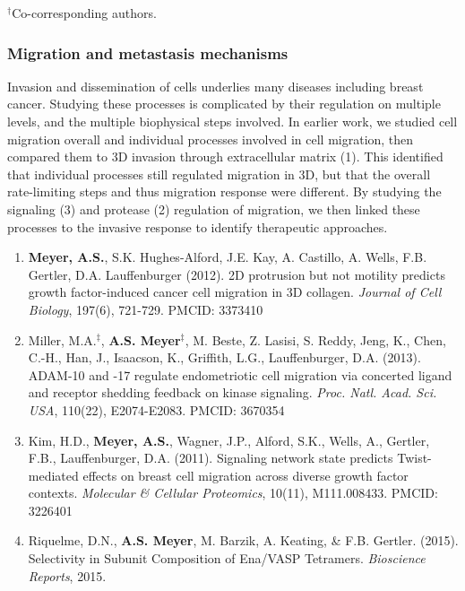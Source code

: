 \documentclass[12pt]{article}
\begin{document}
\noindent $^\dag$Co-corresponding authors.





\subsubsection{Migration and metastasis mechanisms}

Invasion and dissemination of cells underlies many diseases including breast cancer. Studying these processes is complicated by their regulation on multiple levels, and the multiple biophysical steps involved. In earlier work, we studied cell migration overall and individual processes involved in cell migration, then compared them to 3D invasion through extracellular matrix (1). This identified that individual processes still regulated migration in 3D, but that the overall rate-limiting steps and thus migration response were different. By studying the signaling (3) and protease (2) regulation of migration, we then linked these processes to the invasive response to identify therapeutic approaches.

\begin{enumerate}
  \item \textbf{Meyer, A.S.}, S.K. Hughes-Alford, J.E. Kay, A. Castillo, A. Wells, F.B. Gertler, D.A. Lauffenburger (2012). 2D protrusion but not motility predicts growth factor-induced cancer cell migration in 3D collagen. \emph{Journal of Cell Biology}, 197(6), 721-729. PMCID: 3373410
  \item Miller, M.A.$^\ddag$, \textbf{A.S. Meyer}$^\ddag$, M. Beste, Z. Lasisi, S. Reddy, Jeng, K., Chen, C.-H., Han, J., Isaacson, K., Griffith, L.G., Lauffenburger, D.A. (2013). ADAM-10 and -17 regulate endometriotic cell migration via concerted ligand and receptor shedding feedback on kinase signaling. \emph{Proc. Natl. Acad. Sci. USA}, 110(22), E2074-E2083. PMCID: 3670354
  \item Kim, H.D., \textbf{Meyer, A.S.}, Wagner, J.P., Alford, S.K., Wells, A., Gertler, F.B., Lauffenburger, D.A. (2011). Signaling network state predicts Twist-mediated effects on breast cell migration across diverse growth factor contexts. \emph{Molecular \& Cellular Proteomics}, 10(11), M111.008433. PMCID: 3226401
  \item Riquelme, D.N., \textbf{A.S. Meyer}, M. Barzik, A. Keating, \& F.B. Gertler. (2015). Selectivity in Subunit Composition of Ena/VASP Tetramers. \emph{Bioscience Reports}, 2015.
\end{enumerate}
\end{document}

